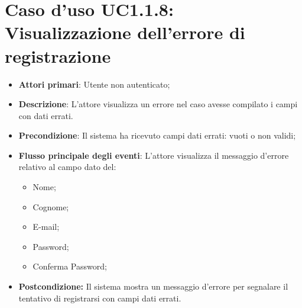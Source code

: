 		\section{Caso d'uso UC1.1.8: Visualizzazione dell'errore di registrazione}
		\begin{itemize}
			\item \textbf{Attori primari}: Utente non autenticato;
			\item \textbf{Descrizione}: L'attore visualizza un errore nel caso avesse compilato i campi con dati errati.
			\item \textbf{Precondizione}: Il sistema ha ricevuto campi dati errati: vuoti o non validi;
			\item \textbf{Flusso principale degli eventi}: L'attore visualizza il messaggio d'errore relativo al campo dato  del:
			\begin{itemize}
				\item Nome;
				\item Cognome;
				\item E-mail;
				\item Password;
				\item Conferma Password;
			\end{itemize}
			\item \textbf{Postcondizione:} Il sistema mostra un messaggio d'errore per segnalare il tentativo di registrarsi con campi dati errati.
		\end{itemize}
